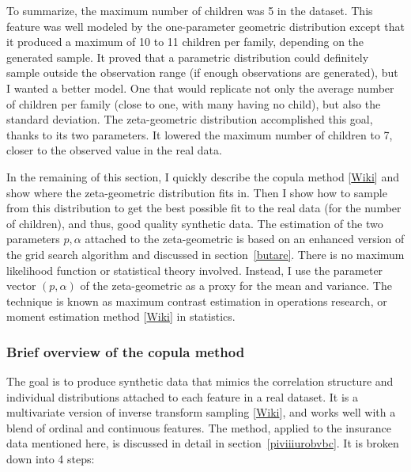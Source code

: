 \documentclass[oneside,10pt]{book}
\begin{document}
To summarize, the maximum number of children was 5 in the dataset. This feature was well modeled by the one-parameter geometric distribution except that it produced a maximum of 10 to 11 children per family, depending on the generated sample. It proved that a parametric distribution
 could definitely sample outside the observation range (if enough observations are generated), but I wanted a better model. One that would replicate not only the average number of children per family (close to one, with many having no child), but also the standard deviation. The zeta-geometric distribution accomplished this goal, thanks to its two parameters. It lowered the maximum number of
 children to 7, closer to the observed value in the real data.

In the remaining of this section, I quickly describe the
\textcolor{index}{copula method} [\href{https://en.wikipedia.org/wiki/Copula_(probability_theory)}{Wiki}] and show where the zeta-geometric distribution fits in. Then
 I show how to sample from this distribution to get the best possible fit to the real data (for the number of children), and thus, good quality synthetic data. The estimation of the two parameters $p,\alpha$ attached to the zeta-geometric is based on an enhanced version of the \textcolor{index}{grid search algorithm} and discussed in section~\ref{butare}. There is no maximum likelihood function or statistical theory involved.
 Instead, I use the parameter vector $(p, \alpha)$ of the zeta-geometric as a proxy for the mean and variance. The technique is known
 as \textcolor{index}{maximum contrast estimation} in operations research, or
\textcolor{index}{moment estimation method} [\href{https://en.wikipedia.org/wiki/Generalized_method_of_moments}{Wiki}]
 in statistics.

\subsubsection{Brief overview of the copula method}\label{chaleur}

The goal is to produce  synthetic data that mimics the correlation structure and individual distributions attached to each feature in a real dataset. It is a multivariate version of
\textcolor{index}{inverse transform sampling} [\href{https://en.wikipedia.org/wiki/Inverse_transform_sampling}{Wiki}], and works well with a blend of ordinal and continuous features.
 The method, applied to the insurance data mentioned here, is discussed in detail in section~\ref{piviiiurobvbc}.
 It is broken down into 4 steps:\vspace{1ex}
\end{document}
